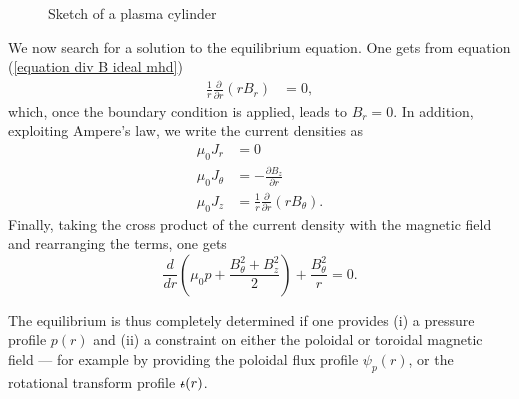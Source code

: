 \documentclass[my_thesis.tex]{subfiles}
\begin{document}
\begin{figure}
	\centering
	\caption{Sketch of a plasma cylinder}
	\label{fig. cylinder sketch}
\end{figure}

We now search for a solution to the equilibrium equation. One gets from equation (\ref{equation div B ideal mhd})
\begin{align}
\frac{1}{r}\frac{\partial}{\partial r}(r B_r) &= 0, 
\end{align}
which, once the boundary condition is applied, leads to $B_r=0$. In addition, exploiting Ampere's law, we write the current densities as
\begin{align}
	\mu_0J_r &= 0\\
	\mu_0J_\theta &= -\frac{\partial B_z}{\partial r}\\
	\mu_0J_z &= \frac{1}{r}\frac{\partial}{\partial r}(rB_\theta).
\end{align} 
Finally, taking the cross product of the current density with the magnetic field and rearranging the terms, one gets
\begin{equation}
	\frac{d}{dr}\left(\mu_0p + \frac{B_\theta^2 + B_z^2}{2}\right) + \frac{B_\theta^2}{r} = 0.
\end{equation}

The equilibrium is thus completely determined if one provides (i) a pressure profile $p(r)$ and (ii) a constraint on either the poloidal or toroidal magnetic field --- for example by providing the poloidal flux profile $\psi_p(r)$, or the rotational transform profile $\text{$\iota\!\!$-}(r)$.
\end{document}
